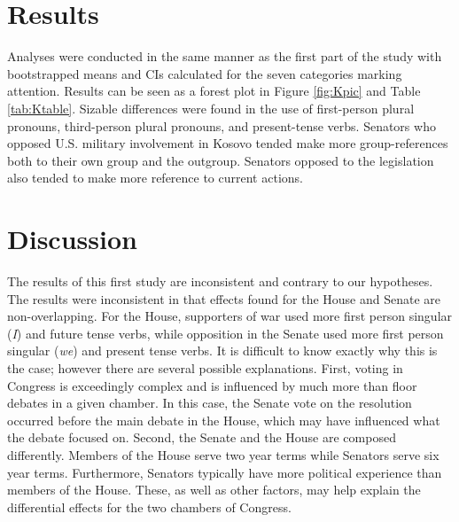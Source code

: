 \documentclass[english,man]{apa6}
\theoremstyle{definition}
\theoremstyle{definition}
\theoremstyle{definition}
\theoremstyle{remark}
\begin{document}
\section{Results}\label{results-1}

Analyses were conducted in the same manner as the first part of the
study with bootstrapped means and CIs calculated for the seven
categories marking attention. Results can be seen as a forest plot in
Figure \ref{fig:Kpic} and Table \ref{tab:Ktable}. Sizable differences
were found in the use of first-person plural pronouns, third-person
plural pronouns, and present-tense verbs. Senators who opposed U.S.
military involvement in Kosovo tended make more group-references both to
their own group and the outgroup. Senators opposed to the legislation
also tended to make more reference to current actions.

\section{Discussion}\label{discussion}

The results of this first study are inconsistent and contrary to our
hypotheses. The results were inconsistent in that effects found for the
House and Senate are non-overlapping. For the House, supporters of war
used more first person singular (\emph{I}) and future tense verbs, while
opposition in the Senate used more first person singular (\emph{we}) and
present tense verbs. It is difficult to know exactly why this is the
case; however there are several possible explanations. First, voting in
Congress is exceedingly complex and is influenced by much more than
floor debates in a given chamber. In this case, the Senate vote on the
resolution occurred before the main debate in the House, which may have
influenced what the debate focused on. Second, the Senate and the House
are composed differently. Members of the House serve two year terms
while Senators serve six year terms. Furthermore, Senators typically
have more political experience than members of the House. These, as well
as other factors, may help explain the differential effects for the two
chambers of Congress.
\end{document}
